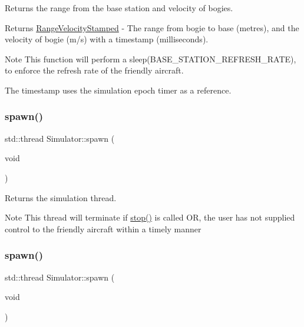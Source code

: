 Returns the range from the base station and velocity of bogies. 

\begin{DoxyReturn}{Returns}
\hyperlink{structRangeVelocityStamped}{Range\+Velocity\+Stamped} -\/ The range from bogie to base (metres), and the velocity of bogie (m/s) with a timestamp (milliseconds). 
\end{DoxyReturn}
\begin{DoxyNote}{Note}
This function will perform a sleep(\+B\+A\+S\+E\+\_\+\+S\+T\+A\+T\+I\+O\+N\+\_\+\+R\+E\+F\+R\+E\+S\+H\+\_\+\+R\+A\+T\+E), to enforce the refresh rate of the friendly aircraft. 

The timestamp uses the simulation epoch timer as a reference. 
\end{DoxyNote}
\mbox{\label{classSimulator_a19ad57d2e32486e1cce2d8702060d930}} 
\subsubsection{\texorpdfstring{spawn()}{spawn()}\hspace{0.1cm}{\footnotesize\ttfamily [1/2]}}
{\footnotesize\ttfamily std\+::thread Simulator\+::spawn (\begin{DoxyParamCaption}\item[{void}]{ }\end{DoxyParamCaption})}



Returns the simulation thread. 

\begin{DoxyNote}{Note}
This thread will terminate if {\ttfamily \hyperlink{classSimulator_ae88ecc16eb03836e8b4a355836d7500b}{stop()}} is called OR, the user has not supplied control to the friendly aircraft within a timely manner 
\end{DoxyNote}
\mbox{\label{classSimulator_a19ad57d2e32486e1cce2d8702060d930}} 
\subsubsection{\texorpdfstring{spawn()}{spawn()}\hspace{0.1cm}{\footnotesize\ttfamily [2/2]}}
{\footnotesize\ttfamily std\+::thread Simulator\+::spawn (\begin{DoxyParamCaption}\item[{void}]{ }\end{DoxyParamCaption})}



